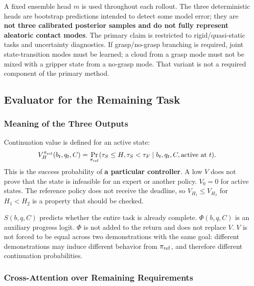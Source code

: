 \documentclass[
  10pt,
]{article}
\begin{document}
A fixed ensemble head \(m\) is used throughout each rollout. The three deterministic heads are bootstrap predictions intended to detect some model error; they are \textbf{not three calibrated posterior samples and do not fully represent aleatoric contact modes}. The primary claim is restricted to rigid/quasi-static tasks and uncertainty diagnostics. If grasp/no-grasp branching is required, joint state-transition modes must be learned; a cloud from a grasp mode must not be mixed with a gripper state from a no-grasp mode. That variant is not a required component of the primary method.

\hypertarget{evaluator-cux1ee7a-phux1ea7n-nhiux1ec7m-vux1ee5-cuxf2n-lux1ea1i}{%
\subsection{Evaluator for the Remaining Task}\label{evaluator-cux1ee7a-phux1ea7n-nhiux1ec7m-vux1ee5-cuxf2n-lux1ea1i}}

\hypertarget{uxfd-nghux129a-cux1ee7a-ba-ux111ux1ea7u-ra}{%
\subsubsection{Meaning of the Three Outputs}\label{uxfd-nghux129a-cux1ee7a-ba-ux111ux1ea7u-ra}}

Continuation value is defined for an active state:
\begin{equation}\label{eq:valuedef}
V_H^{\pi_{\rm ref}}(b_t,q_t,C)=
\Pr_{\pi_{\rm ref}}(\tau_S\leq H,\tau_S<\tau_F
\mid b_t,q_t,C,\text{active at }t).
\end{equation}
This is the success probability of \textbf{a particular controller}. A low \(V\) does not prove that the state is infeasible for an expert or another policy. \(V_0=0\) for active states. The reference policy does not receive the deadline, so \(V_{H_1}\leq V_{H_2}\) for \(H_1<H_2\) is a property that should be checked.

\(S(b,q,C)\) predicts whether the entire task is already complete. \(\Phi(b,q,C)\) is an auxiliary progress logit. \(\Phi\) is not added to the return and does not replace \(V\). \(V\) is not forced to be equal across two demonstrations with the same goal: different demonstrations may induce different behavior from \(\pi_{\rm ref}\), and therefore different continuation probabilities.

\hypertarget{cross-attention-theo-yuxeau-cux1ea7u-cuxf2n-lux1ea1i}{%
\subsubsection{Cross-Attention over Remaining Requirements}\label{cross-attention-theo-yuxeau-cux1ea7u-cuxf2n-lux1ea1i}}
\end{document}
